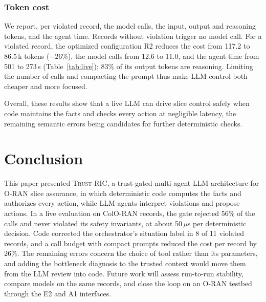 \documentclass[conference]{IEEEtran}
\newcommand{\fw}{\textsc{Trust-RIC}}
\begin{document}
\subsubsection{Token cost} We report, per violated record, the model calls, the input, output and reasoning tokens, and the agent time. Records without violation trigger no model call. For a violated record, the optimized configuration R2 reduces the cost from 117.2 to 86.5\,k tokens ($-26$\%), the model calls from
12.6 to 11.0, and the agent time from 501 to 273\,s (Table~\ref{tab:live});
83\% of its output tokens are reasoning. Limiting the number of calls and compacting the prompt thus make LLM control both cheaper and more focused.

Overall, these results show that a live LLM can drive slice control safely when code maintains the facts and checks every action at negligible latency, the remaining semantic errors being candidates for further deterministic checks.


















\section{Conclusion}
This paper presented \fw{}, a trust-gated multi-agent LLM architecture for O-RAN slice assurance, in which deterministic code computes the facts and authorizes every action, while LLM agents interpret violations and propose actions. In a live evaluation on ColO-RAN records, the gate rejected 56\% of the calls and never violated its safety invariants, at about 50\,$\mu$s per deterministic decision. Code corrected the orchestrator's situation label in 8 of 11 violated records, and a call budget with compact prompts reduced the cost per record by 26\%. The remaining errors concern the choice of tool rather than its parameters, and adding the bottleneck diagnosis to the trusted context would move them from the LLM review into code. Future work will assess run-to-run stability, compare models on the same records, and close the loop on an O-RAN testbed through the E2 and A1 interfaces.


\end{document}
